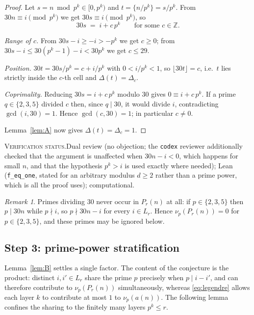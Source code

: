 \documentclass[11pt]{article}
\theoremstyle{plain}
\theoremstyle{definition}
\theoremstyle{remark}
\newtheorem{nremark}[theorem]{Remark}
\numberwithin{equation}{section}
\newcommand{\Z}{\mathbb{Z}}
\newcommand{\Lr}{L_r}
\newcommand{\vstatus}[1]{%
  \par\vspace{3pt}\noindent
  {\small\textsc{Verification status.}\enspace #1}\par\vspace{3pt}}
\begin{document}
\begin{proof}
Let $s = n \bmod p^k \in [0,p^k)$ and $t = \{n/p^k\} = s/p^k$. From $30n \equiv i \pmod{p^k}$ we
get $30s \equiv i \pmod{p^k}$, so
\[
  30 s \;=\; i + c\,p^k \qquad\text{for some } c \in \Z .
\]

\emph{Range of $c$.} From $30s - i \ge -i > -p^k$ we get $c \ge 0$; from
$30s - i \le 30(p^k-1) - i < 30p^k$ we get $c \le 29$.

\emph{Position.} $30t = 30s/p^k = c + i/p^k$ with $0 < i/p^k < 1$, so $\lfloor 30t\rfloor = c$,
i.e.\ $t$ lies strictly inside the $c$-th cell and $\Delta(t) = \Delta_c$.

\emph{Coprimality.} Reducing $30s = i + c\,p^k$ modulo $30$ gives $0 \equiv i + c\,p^k$. If a
prime $q \in \{2,3,5\}$ divided $c$ then, since $q \mid 30$, it would divide $i$, contradicting
$\gcd(i,30)=1$. Hence $\gcd(c,30)=1$; in particular $c \ne 0$.

Lemma~\ref{lem:A} now gives $\Delta(t) = \Delta_c = 1$.
\end{proof}
\vstatus{Dual review (no objection; the \texttt{codex} reviewer additionally checked that the
argument is unaffected when $30n - i < 0$, which happens for small $n$, and that the hypothesis
$p^k > i$ is used exactly where needed); Lean (\texttt{f\_eq\_one}, stated for an arbitrary
modulus $d \ge 2$ rather than a prime power, which is all the proof uses); computational.}

\begin{nremark}
\label{rem:235}
Primes dividing $30$ never occur in $P_r(n)$ at all: if $p \in \{2,3,5\}$ then $p \mid 30n$ while
$p \nmid i$, so $p \nmid 30n - i$ for every $i \in \Lr$. Hence $\nu_p(P_r(n)) = 0$ for
$p \in \{2,3,5\}$, and these primes may be ignored below.
\end{nremark}

\subsection{Step 3: prime-power stratification}

Lemma~\ref{lem:B} settles a single factor. The content of the conjecture is the product: distinct
$i, i' \in \Lr$ share the prime $p$ precisely when $p \mid i - i'$, and can therefore contribute
to $\nu_p(P_r(n))$ simultaneously, whereas \eqref{eq:legendre} allows each layer $k$ to
contribute at most $1$ to $\nu_p(a(n))$. The following lemma confines the sharing to the finitely
many layers $p^k \le r$.
\end{document}
